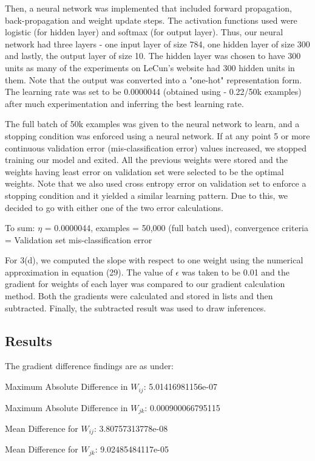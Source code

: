 \documentclass{article}
\begin{document}
Then, a neural network was implemented that included forward propagation, back-propagation and weight update steps. The activation functions used were logistic (for hidden layer) and softmax (for output layer). Thus, our neural network had three layers - one input layer of size 784, one hidden layer of size 300 and lastly, the output layer of size 10. The hidden layer was chosen to have 300 units as many of the experiments on LeCun's website had 300 hidden units in them. Note that the output was converted into a "one-hot" representation form. The learning rate was set to be 0.0000044 (obtained using - 0.22/50k examples) after much experimentation and inferring the best learning rate. 

The full batch of 50k examples was given to the neural network to learn, and a stopping condition was enforced using a neural network. If at any point 5 or more continuous validation error (mis-classification error) values increased, we stopped training our model and exited. All the previous weights were stored and the weights having least error on validation set were selected to be the optimal weights. Note that we also used cross entropy error on validation set to enforce a stopping condition and it yielded a similar learning pattern. Due to this, we decided to go with either one of the two error calculations.

To sum:
$\eta$ = 0.0000044, examples = 50,000 (full batch used), convergence criteria = Validation set mis-classification error 

For 3(d), we computed the slope with respect to one weight using the numerical approximation in equation (29). The value of $\epsilon$ was taken to be 0.01 and the gradient for weights of each layer was compared to our gradient calculation method. Both the gradients were calculated and stored in lists and then subtracted. Finally, the subtracted result was used to draw inferences.

\subsection{Results}
The gradient difference findings are as under:

Maximum Absolute Difference in $W_{ij}$: 5.01416981156e-07

Maximum Absolute Difference in $W_{jk}$: 0.000900066795115

Mean Difference for $W_{ij}$: 3.80757313778e-08

Mean Difference for $W_{jk}$: 9.02485484117e-05
\end{document}
